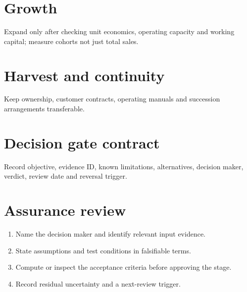 \documentclass[11pt]{article}
\begin{document}
\section{Growth}
Expand only after checking unit economics, operating capacity and working capital; measure cohorts not just total sales.
\section{Harvest and continuity}
Keep ownership, customer contracts, operating manuals and succession arrangements transferable.
\section{Decision gate contract}
Record objective, evidence ID, known limitations, alternatives, decision maker, verdict, review date and reversal trigger.
\section{Assurance review}
\begin{enumerate}[leftmargin=*,itemsep=5pt]
\item Name the decision maker and identify relevant input evidence.
\item State assumptions and test conditions in falsifiable terms.
\item Compute or inspect the acceptance criteria before approving the stage.
\item Record residual uncertainty and a next-review trigger.
\end{enumerate}
\end{document}
